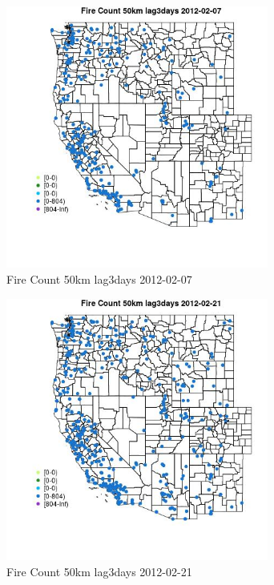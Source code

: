 \begin{figure} 
\centering  
\includegraphics[width=0.77\textwidth]{Code_Outputs/Report_ML_input_PM25_Step4_part_f_de_duplicated_aveswNAs_MapObsFire_Count_50km_lag3days2012-02-07.jpg} 
\caption{\label{fig:Report_ML_input_PM25_Step4_part_f_de_duplicated_aveswNAsMapObsFire_Count_50km_lag3days2012-02-07}Fire Count 50km lag3days 2012-02-07} 
\end{figure} 
 

\begin{figure} 
\centering  
\includegraphics[width=0.77\textwidth]{Code_Outputs/Report_ML_input_PM25_Step4_part_f_de_duplicated_aveswNAs_MapObsFire_Count_50km_lag3days2012-02-21.jpg} 
\caption{\label{fig:Report_ML_input_PM25_Step4_part_f_de_duplicated_aveswNAsMapObsFire_Count_50km_lag3days2012-02-21}Fire Count 50km lag3days 2012-02-21} 
\end{figure} 
 

